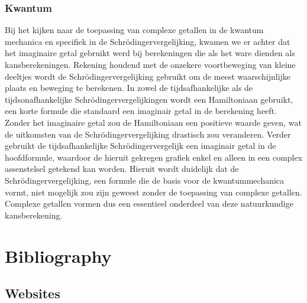\documentclass[11pt,fleqn]{book} %
\begin{document}
\subsection{Kwantum}
Bij het kijken naar de toepassing van complexe getallen in de kwantum mechanica en specifiek in de Schrödingervergelijking, kwamen we er achter dat het imaginaire getal gebruikt werd bij berekeningen die als het ware dienden als kansberekeningen. Rekening houdend met de onzekere voortbeweging van kleine deeltjes wordt de Schrödingervergelijking gebruikt om de meest waarschijnlijke plaats en beweging te berekenen. 
In zowel de tijdsafhankelijke als de tijdsonafhankelijke Schrödingervergelijkingen wordt een Hamiltoniaan gebruikt, een korte formule die standaard een imaginair getal in de berekening heeft. Zonder het imaginaire getal zou de Hamiltoniaan een positieve waarde geven, wat de uitkomsten van de Schrödingervergelijking drastisch zou veranderen. Verder gebruikt de tijdsafhankelijke Schrödingervergelijk een imaginair getal in de hoofdformule, waardoor de hieruit gekregen grafiek enkel en alleen in een complex assenstelsel getekend kan worden.
Hieruit wordt duidelijk dat de Schrödingervergelijking, een formule die de basis voor de kwantummechanica vormt, niet mogelijk zou zijn geweest zonder de toepassing van complexe getallen. Complexe getallen vormen dus een essentieel onderdeel van deze natuurkundige kansberekening.


\chapter*{Bibliography}




\section*{Websites}
\printbibliography[heading=bibempty,type=online]
\printbibliography[heading=bibempty,type=misc]
\end{document}
